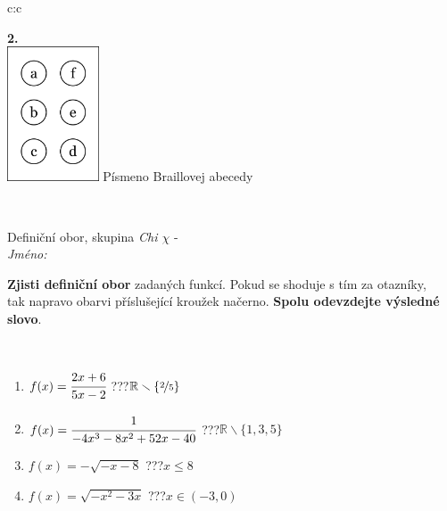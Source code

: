 \documentclass[10pt]{report}
\begin{document}
\begin{tabular}{c:c}
\begin{minipage}[c][104.5mm][t]{0.5\linewidth}
\begin{center}
\begin{minipage}{0.20\linewidth}
\begin{center}
{\Huge\bfseries 2.} \\[2mm]
\includegraphics[height=40mm]{../images/braille.png}
{\small Písmeno Braillovej abecedy}
\end{center}
\end{minipage}
\end{center}
\end{minipage}
\\ \hdashline
\begin{minipage}[c][104.5mm][t]{0.5\linewidth}
\begin{center}
\vspace{7mm}
{\huge Definiční obor, skupina \textit{Chi $\chi$} -}\\[5mm]
\textit{Jméno:}\phantom{xxxxxxxxxxxxxxxxxxxxxxxxxxxxxxxxxxxxxxxxxxxxxxxxxxxxxxxxxxxxxxxxx}\\[5mm]
\begin{minipage}{0.95\linewidth}
\begin{center}
\textbf{Zjisti definiční obor} zadaných funkcí. Pokud se shoduje s tím za otazníky,\\tak napravo obarvi příslušející kroužek načerno. \textbf{Spolu odevzdejte výsledné slovo}.
\end{center}
\end{minipage}
\\[1mm]
\begin{minipage}{0.79\linewidth}
\begin{center}
\begin{varwidth}{\linewidth}
\begin{enumerate}
\normalsizerrr
\item $f(x)=\cfrac{2x+6}{5x-2}$\quad \dotfill\; ???\;\dotfill \quad $\mathbb{R}\smallsetminus\{\nicefrac{2}{5}\}$
\item $f(x)=\cfrac{1}{-4x^3-8x^2+52x-40}$\quad \dotfill\; ???\;\dotfill \quad $\mathbb{R}\smallsetminus\{1,3,5\}$
\item $f(x)=-\sqrt{-x-8}$\quad \dotfill\; ???\;\dotfill \quad $x\leq8$
\item $f(x)=\sqrt{-x^2-3x}$\quad \dotfill\; ???\;\dotfill \quad $x\in(-3 , 0)$

\end{enumerate}
\end{varwidth}
\end{center}
\end{minipage}
\end{center}
\end{minipage}
\end{tabular}
\end{document}
